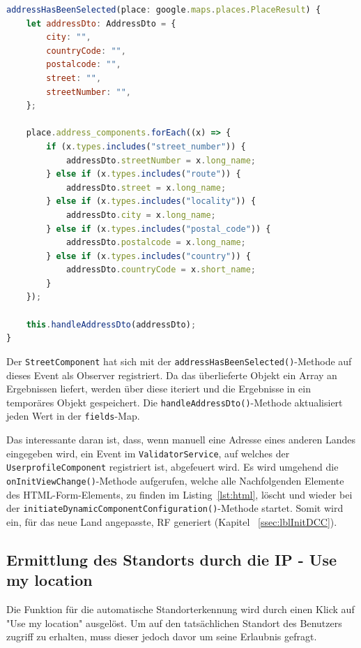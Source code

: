 \begin{lstlisting}[caption={Die \texttt{addressHasBeenSelected()}-Methode der \texttt{StreetComponent}-Klasse}, language=JavaScript,label={lst:gpac}]
addressHasBeenSelected(place: google.maps.places.PlaceResult) {
	let addressDto: AddressDto = {
		city: "",
		countryCode: "",
		postalcode: "",
		street: "",
		streetNumber: "",
	};
	
	place.address_components.forEach((x) => {
		if (x.types.includes("street_number")) {
			addressDto.streetNumber = x.long_name;
		} else if (x.types.includes("route")) {
			addressDto.street = x.long_name;
		} else if (x.types.includes("locality")) {
			addressDto.city = x.long_name;
		} else if (x.types.includes("postal_code")) {
			addressDto.postalcode = x.long_name;
		} else if (x.types.includes("country")) {
			addressDto.countryCode = x.short_name;
		}
	});
	
	this.handleAddressDto(addressDto);
}
\end{lstlisting}

Der \texttt{StreetComponent} hat sich mit der \texttt{addressHasBeenSelected()}-Methode auf dieses Event als Observer registriert. Da das überlieferte Objekt ein Array an Ergebnissen liefert, werden über diese iteriert und die Ergebnisse in ein temporäres Objekt gespeichert. Die \texttt{handleAddressDto()}-Methode aktualisiert jeden Wert in der \texttt{fields}-Map. 

Das interessante daran ist, dass, wenn manuell eine Adresse eines anderen Landes eingegeben wird, ein Event im \texttt{ValidatorService}, auf welches der \texttt{UserprofileComponent} registriert ist, abgefeuert wird. Es wird umgehend die \texttt{onInitViewChange()}-Methode aufgerufen, welche alle Nachfolgenden Elemente des HTML-Form-Elements, zu finden im Listing~\ref{lst:html}, löscht und wieder bei der \texttt{initiateDynamicComponentConfiguration()}-Methode startet. Somit wird ein, für das neue Land angepasste, RF generiert (Kapitel ~\ref{ssec:lblInitDCC}).


\subsection{Ermittlung des Standorts durch die IP - Use my location}

Die Funktion für die automatische Standorterkennung wird durch einen Klick auf "Use my location" ausgelöst. Um auf den tatsächlichen Standort des Benutzers zugriff zu erhalten, muss dieser jedoch davor um seine Erlaubnis gefragt.\autocite{useMyLocation}

